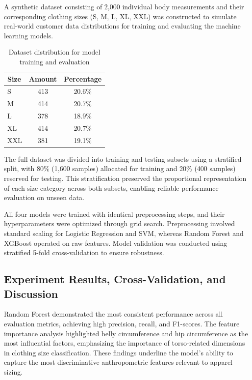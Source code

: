 \documentclass{llncs}
\begin{document}
A synthetic dataset consisting of 2,000 individual body measurements and their corresponding clothing sizes (S, M, L, XL, XXL) was constructed to simulate real-world customer data distributions for 
    training and evaluating the machine learning models.


\begin{table}[H]
\centering
\caption{Dataset distribution for model training and evaluation}
\begin{tabular}{lcc}
\toprule
Size & Amount & Percentage \\
\midrule
S & 413 & 20.6\% \\
M & 414 & 20.7\% \\
L & 378 & 18.9\% \\
XL & 414 & 20.7\% \\
XXL & 381 & 19.1\% \\
\bottomrule
\end{tabular}
\end{table}


The full dataset was divided into training and testing subsets using a stratified split, with 80\% (1,600 samples) allocated for training and 20\% (400 samples) reserved for testing. 
This stratification preserved the proportional representation of each size category across both subsets, enabling reliable performance evaluation on unseen data.

All four models were trained with identical preprocessing steps, and their hyperparameters were optimized through grid search. 
Preprocessing involved standard scaling for Logistic Regression and SVM, whereas Random Forest and XGBoost operated on raw features. 
Model validation was conducted using stratified 5-fold cross-validation to ensure robustness.

\subsection{Experiment Results, Cross-Validation, and Discussion}

Random Forest demonstrated the most consistent performance across all evaluation metrics, achieving high precision, recall, and F1-scores. 
The feature importance analysis highlighted belly circumference and hip circumference as the most influential factors, emphasizing the importance of torso-related dimensions in clothing size classification. 
These findings underline the model’s ability to capture the most discriminative anthropometric features relevant to apparel sizing.
\end{document}
